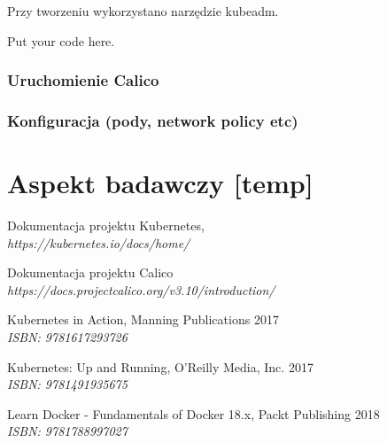 \documentclass[pl,final,oneside]{mgr} %
\begin{document}
Przy tworzeniu wykorzystano narzędzie kubeadm.
  
  


Put your code here.



\subsection{Uruchomienie Calico}


\subsection{Konfiguracja (pody, network policy etc)}



\chapter{Aspekt badawczy [temp]}

\begin{thebibliography}{99}
	Dokumentacja projektu Kubernetes,
	\\ \textit{https://kubernetes.io/docs/home/}
	
	Dokumentacja projektu Calico \\
	\textit{https://docs.projectcalico.org/v3.10/introduction/}

	Kubernetes in Action, Manning Publications 2017 \\
	\textit{ISBN: 9781617293726}
	
	Kubernetes: Up and Running, O'Reilly Media, Inc. 2017 \\
	\textit{ISBN: 9781491935675}
	
	Learn Docker - Fundamentals of Docker 18.x, Packt Publishing 2018\\
	\textit{ISBN: 9781788997027}

\end{thebibliography}
\end{document}
